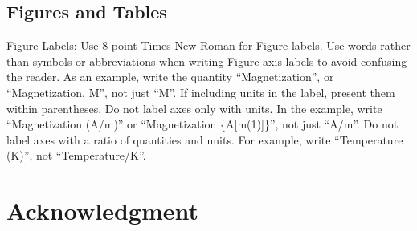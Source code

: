 \documentclass[conference]{IEEEtran}
\begin{document}
\subsection{Figures and Tables}





Figure Labels: Use 8 point Times New Roman for Figure labels. Use words 
rather than symbols or abbreviations when writing Figure axis labels to 
avoid confusing the reader. As an example, write the quantity 
``Magnetization'', or ``Magnetization, M'', not just ``M''. If including 
units in the label, present them within parentheses. Do not label axes only 
with units. In the example, write ``Magnetization (A/m)'' or ``Magnetization 
\{A[m(1)]\}'', not just ``A/m''. Do not label axes with a ratio of 
quantities and units. For example, write ``Temperature (K)'', not 
``Temperature/K''.

\section*{Acknowledgment}



\end{document}
